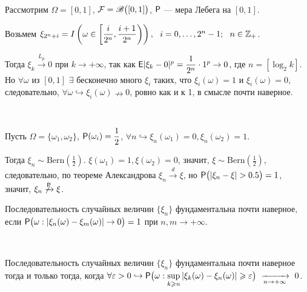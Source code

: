 \begin{example}~

	Рассмотрим $\Omega = [0, 1]$, $\F = \B\big([0,1] \big)$, $\P$ --- мера Лебега на $[0, 1]$. 
	
	Возьмем $\xi_{2^n + i} = I \left( \omega \in \left[ \dfrac{i}{2^n}, \dfrac{i + 1}{2^n} \right) \right), ~~i = 0,\ldots, 2^n - 1;~~n \in \Z_+$. 
	
	Тогда $\xi_k \xrightarrow{L_p} 0$ при $k \rightarrow + \infty$, так как $\E | \xi_k  - 0 |^p = \dfrac{1}{2^n} \cdot 1^p \rightarrow 0$, где $n = \left[ \log_2 k \right]$. 
	Но $\forall \omega$ из $[0,1]$ $\exists$ бесконечно много $\xi_i$ таких, что $\xi_i(\omega) = 1$ и $\xi_i(\omega) = 0$, следовательно, $\forall \omega \hookrightarrow \xi_i(\omega) \nrightarrow 0$, ровно как и к 1, в смысле почти наверное.
\end{example}

\begin{example}~

	Пусть $\Omega = \{ \omega_1, \omega_2 \}$, $\P(\omega_i) = \dfrac{1}{2}$, $\forall n \hookrightarrow \xi_n(\omega_1) = 0, \xi_n(\omega_2) = 1$.
	
	Тогда $\xi_n \sim \text{Bern} \left( \frac{1}{2} \right)$. $\xi(\omega_1) = 1, \xi(\omega_2) = 0$, значит, $\xi \sim \text{Bern} \left( \frac{1}{2} \right)$, следовательно, по теореме Александрова $\xi_n \xrightarrow{d} \xi$, но $\P \big( | \xi_n - \xi| > 0.5 \big) = 1$, значит, $\xi_n \not\xrightarrow{\P} \xi$. 
\end{example}

\begin{definition}
    Последовательность случайных величин $\{ \xi_n \}$ фундаментальна почти наверное, если $\P  \big( \omega : | \xi_n(\omega) - \xi_m(\omega) | \rightarrow 0 \big) = 1$ при $n, m \rightarrow + \infty$.
\end{definition}

\begin{lemma}~

	Последовательность случайных величин $\{ \xi_n \}$ фундаментальна почти наверное тогда и только тогда, когда $\forall \varepsilon > 0 \hookrightarrow \P\big(\omega: \sup\limits_{k \geqslant n} | \xi_k(\omega) - \xi_n(\omega) | \geqslant \varepsilon \big)~\limn~0$.
\end{lemma}

